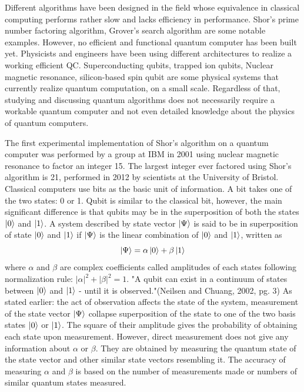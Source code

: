 Different algorithms have been designed in the field whose equivalence in classical computing performs rather slow and lacks efficiency in performance. Shor's prime number factoring algorithm, Grover's search algorithm are some notable examples. However, no efficient and functional quantum computer has been built yet. Physicists and engineers have been using different architectures to realize a working efficient \acrshort{QC}. Superconducting qubits, trapped ion qubits, Nuclear magnetic resonance, silicon-based spin qubit are some physical systems that currently realize quantum computation, on a small scale.\cite{Hidary} Regardless of that, studying and discussing quantum algorithms does not necessarily require a workable quantum computer and not even detailed knowledge about the physics of quantum computers.\cite{Cheung}

The first experimental implementation of Shor's algorithm on a quantum computer was performed by a group at IBM in 2001 using nuclear magnetic resonance to factor an integer 15. \cite{vandersypen2001experimental} The largest integer ever factored using  Shor's algorithm is 21, performed in 2012 by scientists at the University of Bristol.\cite{martin2012experimental}
Classical computers use bits as the basic unit of information. A bit takes one of the two states: 0 or 1. Qubit is similar to the classical bit, however, the main significant difference is that qubits may be in the superposition of both the states $\ket{0}$ and $\ket{1}$. A system described  by state vector $\ket{\Psi}$ is said to be in superposition of state $\ket{0}$ and $\ket{1}$ if $\ket{\Psi}$ is the linear combination of $\ket{0}$ and $\ket{1}$, written as \begin{equation}\ket{\Psi} = \alpha\ket{0} + \beta\ket{1}\label{eq: 2.1}\end{equation}
where $\alpha$ and $\beta$ are complex coefficients called amplitudes of each states following normalization rule: ${|\alpha|}^{2} + {|\beta|}^{2} = 1$. "A qubit can exist in a continuum of states between $\ket{0}$ and $\ket{1}$ - until it is observed."(Neilsen and Chuang, 2002, pg. 3)\cite{Nielsen2002} As stated earlier: the act of observation affects the state of the system, measurement of the state vector $\ket{\Psi}$ collapse superposition of the state to one of the two basis states $\ket{0}$ or $\ket{1}$. The square of their amplitude gives the probability of obtaining each state upon measurement. However, direct measurement does not give any information about $\alpha$ or $\beta$. They are obtained by measuring the quantum state of the state vector and other similar state vectors resembling it. The accuracy of measuring $\alpha$ and $\beta$ is based on the number of measurements made or numbers of similar quantum states measured.




